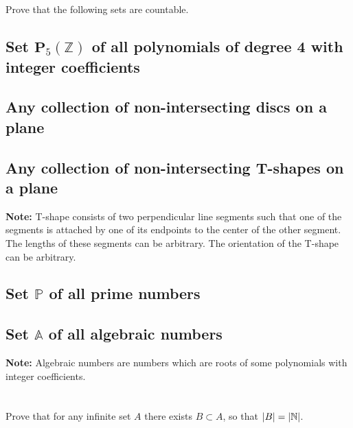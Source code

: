\documentclass[]{article}
\newcommand{\N}{\mathbb{N}}
\newcommand{\Z}{\mathbb{Z}}
\begin{document}
\newpage
\section{}
Prove that the following sets are countable.

\subsection{Set $\mathbf{P}_5(\Z)$ of all polynomials of degree 4 with integer coefficients}


\subsection{Any collection of non-intersecting discs on a plane}



\subsection{Any collection of non-intersecting T-shapes on a plane}
\textbf{Note:} T-shape consists of two perpendicular line segments such that 
one of the segments is attached by one of its endpoints to the center of the other segment. 
The lengths of these segments can be arbitrary. The orientation of the T-shape can be arbitrary.




\subsection{Set $\mathbb{P}$ of all prime numbers}



\subsection{Set $\mathbb{A}$ of all algebraic numbers}
\textbf{Note:} Algebraic numbers are numbers which are roots of 
some polynomials with integer coefficients.








\newpage
\section{}
Prove that for any infinite set $A$ there exists $B \subset A$, so that $\abs{B}=\abs{\N}$.
\end{document}
